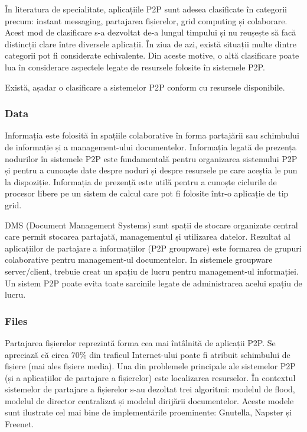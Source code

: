 În literatura de specialitate, aplicațiile P2P sunt adesea clasificate în
categorii precum: instant messaging, partajarea fișierelor, grid computing și
colaborare. Acest mod de clasificare s-a dezvoltat de-a lungul timpului și nu
reușește să facă distincții clare între diversele aplicații. În ziua de azi,
există situații multe dintre categorii pot fi considerate echivalente. Din
aceste motive, o altă clasificare poate lua în considerare aspectele legate de
resursele folosite în sistemele P2P.

Există, așadar o clasificare a sistemelor P2P conform cu resursele
disponibile.

\subsubsection{Data}

Informația este folosită în spațiile colaborative în forma partajării sau
schimbului de informație și a management-ului documentelor. Informația legată
de prezența nodurilor în sistemele P2P este fundamentală pentru organizarea
sistemului P2P și pentru a cunoaște date despre noduri și despre resursele pe
care aceștia le pun la dispoziție. Informația de prezență este utilă pentru a
cunoște ciclurile de procesor libere pe un sistem de calcul care pot fi
folosite într-o aplicație de tip grid.

DMS (Document Management Systems) sunt spații de stocare organizate central
care permit stocarea partajată, managementul și utilizarea datelor. Rezultat
al aplicațiilor de partajare a informațiilor (P2P groupware) este formarea de
grupuri colaborative pentru management-ul documentelor. In sistemele groupware
server/client, trebuie creat un spațiu de lucru pentru management-ul
informației. Un sistem P2P poate evita toate sarcinile legate de administrarea
acelui spațiu de lucru.

\subsubsection{Files}

Partajarea fișierelor reprezintă forma cea mai întâlnită de aplicații P2P. Se
apreciază că circa 70\% din traficul Internet-ului poate fi atribuit schimbului
de fișiere (mai ales fișiere media). Una din problemele principale ale
sistemelor P2P (și a aplicațiilor de partajare a fișierelor) este localizarea
resurselor. În contextul sistemelor de partajare a fișierelor s-au dezoltat
trei algoritmi: modelul de flood, modelul de director centralizat și modelul
dirijării documentelor. Aceste modele sunt ilustrate cel mai bine de
implementările proeminente: Gnutella, Napster și Freenet.

